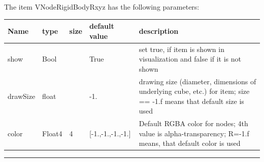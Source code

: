 The item VNodeRigidBodyRxyz has the following parameters:\vspace{-1cm}\\ 
\begin{center}
  \footnotesize
  \begin{longtable}{| p{4.5cm} | p{2.5cm} | p{0.5cm} | p{2.5cm} | p{6cm} |}
    \hline
    \bf Name & \bf type & \bf size & \bf default value & \bf description \\ \hline
    show &     Bool &      &     True &     set true, if item is shown in visualization and false if it is not shown\\ \hline
    drawSize &     float &      &     -1. &     drawing size (diameter, dimensions of underlying cube, etc.)  for item; size == -1.f means that default size is used\\ \hline
    color &     Float4 &     4 &     [-1.,-1.,-1.,-1.] &     Default RGBA color for nodes; 4th value is alpha-transparency; R=-1.f means, that default color is used\\ \hline
	  \end{longtable}
	\end{center}
\par\noindent\rule{\textwidth}{0.4pt}
\label{description_NodeRigidBodyRxyz}
